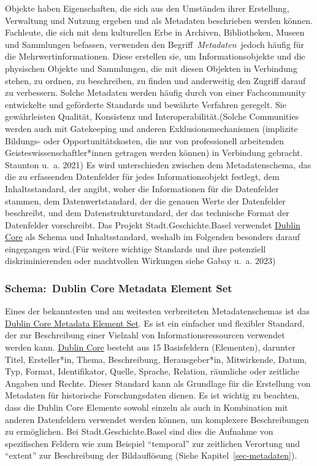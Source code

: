 \documentclass[
  nswissgerman,
  letterpaper,
  DIV=11,
  numbers=noendperiod]{scrartcl}
\begin{document}
Objekte haben Eigenschaften, die sich aus den Umständen ihrer
Erstellung, Verwaltung und Nutzung ergeben und als Metadaten beschrieben
werden können. Fachleute, die sich mit dem kulturellen Erbe in Archiven,
Bibliotheken, Museen und Sammlungen befassen, verwenden den
Begriff~\emph{Metadaten}~jedoch häufig für die Mehrwertinformationen.
Diese erstellen sie, um Informationsobjekte und die physischen Objekte
und Sammlungen, die mit diesen Objekten in Verbindung stehen, zu ordnen,
zu beschreiben, zu finden und anderweitig den Zugriff darauf zu
verbessern. Solche Metadaten werden häufig durch von einer Fachcommunity
entwickelte und geförderte Standards und bewährte Verfahren geregelt.
Sie gewährleisten Qualität, Konsistenz und Interoperabilität.(Solche
Communities werden auch mit Gatekeeping und anderen
Exklusionsmechanismen (implizite Bildungs- oder Opportunitätskosten, die
nur von professionell arbeitenden Geisteswissenschaftler*innen getragen
werden können) in Verbindung gebracht. Staunton u.~a. 2021) Es wird
unterschieden zwischen dem Metadatenschema, das die zu erfassenden
Datenfelder für jedes Informationsobjekt festlegt, dem Inhaltsstandard,
der angibt, woher die Informationen für die Datenfelder stammen, dem
Datenwertstandard, der die genauen Werte der Datenfelder beschreibt, und
dem Datenstrukturstandard, der das technische Format der Datenfelder
vorschreibt. Das Projekt Stadt.Geschichte.Basel verwendet
\href{https://www.dublincore.org}{Dublin Core} als Schema und
Inhaltsstandard, weshalb im Folgenden besonders darauf eingegangen
wird.(Für weitere wichtige Standards und ihre potenziell
diskriminierenden oder machtvollen Wirkungen siehe Gabay u.~a. 2023)

\subsubsection{Schema:~Dublin Core Metadata Element
Set}\label{schema-dublin-core-metadata-element-set}

Eines der bekanntesten und am weitesten verbreiteten Metadatenschemas
ist das
\href{https://www.dublincore.org/specifications/dublin-core/dces/}{Dublin
Core Metadata Element Set}. Es ist ein einfacher und flexibler Standard,
der zur Beschreibung einer Vielzahl von Informationsressourcen verwendet
werden kann. \href{https://www.dublincore.org}{Dublin Core} besteht aus
15 Basisfeldern (Elementen), darunter Titel, Ersteller*in, Thema,
Beschreibung, Herausgeber*in, Mitwirkende, Datum, Typ, Format,
Identifikator, Quelle, Sprache, Relation, räumliche oder zeitliche
Angaben und Rechte. Dieser Standard kann als Grundlage für die
Erstellung von Metadaten für historische Forschungsdaten dienen. Es ist
wichtig zu beachten, dass die Dublin Core Elemente sowohl einzeln als
auch in Kombination mit anderen Datenfeldern verwendet werden können, um
komplexere Beschreibungen zu ermöglichen. Bei Stadt.Geschichte.Basel
sind dies die Aufnahme von spezifischen Feldern wie zum Beispiel
``temporal'' zur zeitlichen Verortung und ``extent'' zur Beschreibung
der Bildauflösung (Siehe Kapitel~\ref{sec-metadaten}).
\end{document}
